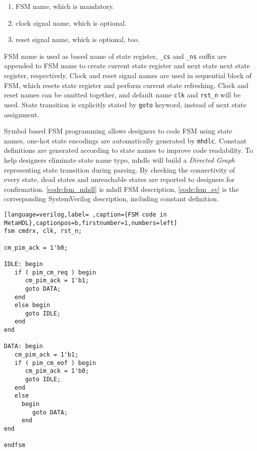 \documentclass[10pt,oneside]{book}
\begin{document}
\begin{enumerate}
\item FSM name, which is mandatory.
\item clock signal name, which is optional.
\item reset signal name, which is optional, too.
\end{enumerate}

FSM name is used as based name of state register, \texttt{\_cs} and \texttt{\_ns}
suffix are appended to FSM name to create current state register and
next state next state register, respectively.  Clock and reset signal
names are used in sequential block of FSM, which resets state register
and perform current state refreshing.  Clock and reset names can be
omitted together, and default name \texttt{clk} and \texttt{rst\_n} will be used.
State transition is explicitly stated by \texttt{goto} keyword, instead of
next state assignment.

Symbol based FSM programming allows designers to code FSM using state
names, one-hot state encodings are automatically generated by \texttt{mhdlc}.
Constant definitions are generated according to state names to improve
code readability.  To help designers eliminate state name typo, mhdlc
will build a \emph{Directed Graph} representing state transition during
parsing.  By checking the connectivity of every state, dead states and
unreachable states are reported to designers for confirmation.
\autoref{code:fsm_mhdl} is mhdl FSM description, \autoref{code:fsm_sv} is
the corresponding SystemVerilog description, including constant
definition.

\begin{lstlisting}[language=verilog,label= ,caption={FSM code in MetaHDL},captionpos=b,firstnumber=1,numbers=left]
fsm cmdrx, clk, rst_n; 

cm_pim_ack = 1'b0;

IDLE: begin
   if ( pim_cm_req ) begin
      cm_pim_ack = 1'b1; 
      goto DATA; 
   end
   else begin
      goto IDLE; 
   end
end

DATA: begin
   cm_pim_ack = 1'b1; 
   if ( pim_cm_eof ) begin
      cm_pim_ack = 1'b0; 
      goto IDLE; 
   end
   else
     begin
        goto DATA; 
     end
end

endfsm
\end{lstlisting}
\end{document}
